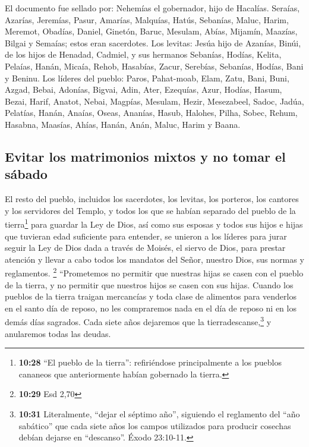  El documento fue sellado por: Nehemías el gobernador,
hijo de Hacalías.  Seraías, Azarías, Jeremías,
 Pasur, Amarías, Malquías,  Hatús, Sebanías,
Maluc,  Harim, Meremot, Obadías,  Daniel,
Ginetón, Baruc,  Mesulam, Abías, Mijamín, 
Maazías, Bilgai y Semaías; estos eran sacerdotes.  Los
levitas: Jesúa hijo de Azanías, Binúi, de los hijos de Henadad, Cadmiel,
 y sus hermanos Sebanías, Hodías, Kelita, Pelaías, Hanán,
 Micaía, Rehob, Hasabías,  Zacur,
Serebías, Sebanías,  Hodías, Bani y Beninu.
 Los líderes del pueblo: Paros, Pahat-moab, Elam, Zatu,
Bani,  Buni, Azgad, Bebai,  Adonías,
Bigvai, Adin,  Ater, Ezequías, Azur, 
Hodías, Hasum, Bezai,  Harif, Anatot, Nebai,
 Magpías, Mesulam, Hezir,  Mesezabeel,
Sadoc, Jadúa,  Pelatías, Hanán, Anaías, 
Oseas, Ananías, Hasub,  Halohes, Pilha, Sobec,
 Rehum, Hasabna, Maasías,  Ahías, Hanán,
Anán,  Maluc, Harim y Baana.

\hypertarget{evitar-los-matrimonios-mixtos-y-no-tomar-el-suxe1bado}{%
\subsection{Evitar los matrimonios mixtos y no tomar el
sábado}\label{evitar-los-matrimonios-mixtos-y-no-tomar-el-suxe1bado}}

 El resto del pueblo, incluidos los sacerdotes, los
levitas, los porteros, los cantores y los servidores del Templo, y todos
los que se habían separado del pueblo de la tierra\footnote{\textbf{10:28}
  ``El pueblo de la tierra'': refiriéndose principalmente a los pueblos
  cananeos que anteriormente habían gobernado la tierra.} para guardar
la Ley de Dios, así como sus esposas y todos sus hijos e hijas que
tuvieran edad suficiente para entender,  se unieron a los
líderes para jurar seguir la Ley de Dios dada a través de Moisés, el
siervo de Dios, para prestar atención y llevar a cabo todos los mandatos
del Señor, nuestro Dios, sus normas y reglamentos. \footnote{\textbf{10:29}
  Esd 2,70}  ``Prometemos no permitir que nuestras hijas
se casen con el pueblo de la tierra, y no permitir que nuestros hijos se
casen con sus hijas.  Cuando los pueblos de la tierra
traigan mercancías y toda clase de alimentos para venderlos en el santo
día de reposo, no les compraremos nada en el día de reposo ni en los
demás días sagrados. Cada siete años dejaremos que la
tierradescanse,\footnote{\textbf{10:31} Literalmente, ``dejar el séptimo
  año'', siguiendo el reglamento del ``año sabático'' que cada siete
  años los campos utilizados para producir cosechas debían dejarse en
  ``descanso''. Éxodo 23:10-11.} y anularemos todas las deudas.

